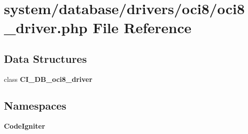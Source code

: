 \section{system/database/drivers/oci8/oci8\-\_\-driver.php File Reference}
\label{oci8__driver_8php}
\subsection*{Data Structures}
\begin{DoxyCompactItemize}
\item 
class {\bf C\-I\-\_\-\-D\-B\-\_\-oci8\-\_\-driver}
\end{DoxyCompactItemize}
\subsection*{Namespaces}
\begin{DoxyCompactItemize}
\item 
{\bf Code\-Igniter}
\end{DoxyCompactItemize}
